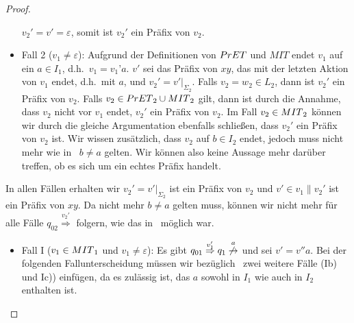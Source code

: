 \begin{proof}
\begin{itemize}
      $v_2'=v'=\varepsilon$, somit ist $v_2'$ ein Präfix von $v_2$.
    \item Fall 2 ($v_1\neq\varepsilon$): Aufgrund der Definitionen von $PrET{}$
      und $MIT$ endet $v_1$ auf ein $a\in I_1$, d.h.\ $v_1=v_1’a$. $v'$ sei das
      Präfix von $xy$, das mit der letzten Aktion von $v_1$ endet, d.h.\ mit
      $a$, und $v_2'=v'|_{\Sigma _{2}}$. Falls $v_2 = w_2\in L_2$, dann ist
      $v_2'$ ein Präfix von $v_2$. Falls $v_2\in
      PrET{}_2\cup MIT{}_2$ gilt, dann ist durch die Annahme, dass $v_2$ nicht vor
      $v_1$ endet, $v_2'$ ein Präfix von $v_2$. Im Fall $v_2\in MIT{}_2$ können
      wir durch die gleiche Argumentation ebenfalls schließen, dass $v_2'$ ein
      Präfix von $v_2$ ist. Wir wissen zusätzlich, dass $v_2$ auf $b\in
      I_2$ endet, jedoch muss nicht mehr wie in~\cite{Vogler2014EIO} $b\neq a$
      gelten. Wir können also keine Aussage mehr darüber treffen, ob es sich um
      ein echtes Präfix handelt.
  \end{itemize}
  In allen Fällen erhalten wir $v_2'=v'|_{\Sigma _2}$ ist ein Präfix von $v_2$
  und $v'\in v_1\| v_2'$ ist ein Präfix von $xy$. Da nicht mehr $b\neq a$
  gelten muss, können wir nicht mehr für alle Fälle
  $q_{02}\overset{v_2'}{\Rightarrow}$ folgern, wie das in~\cite{Vogler2014EIO}
  möglich war.
  \begin{itemize}
    \item Fall I ($v_1\in MIT{}_1$ und $v_1\neq\varepsilon$): Es gibt $q_{01}
      \overset{v_1'}{\Rightarrow}q_1
      \overset{a}{\not{\hspace{-0.1cm}\rightarrow}}$ und sei $v'=v''a$. Bei der
      folgenden Fallunterscheidung müssen wir bezüglich~\cite{Vogler2014EIO}
      zwei weitere Fälle (Ib) und Ic)) einfügen, da es zulässig ist, das $a$
      sowohl in $I_1$ wie auch in $I_2$ enthalten ist.
\end{itemize}
\end{proof}
